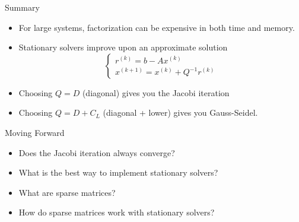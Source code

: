 \documentclass[10pt]{beamer}
\begin{document}



\begin{frame}{Summary}
    \begin{itemize}
    \item For large systems, factorization can be expensive in both time and memory.
        \vfill 
        \item Stationary solvers improve upon an approximate solution 
        $$\begin{cases}
    r^{(k)} = b - Ax^{(k)} \\
    x^{(k+1)} = x^{(k)} + Q^{-1} r^{(k)}
    \end{cases}$$
        \item Choosing $Q=D$ (diagonal) gives you the Jacobi iteration
        \vfill
        \item Choosing $Q=D+C_L$ (diagonal + lower) gives you Gauss-Seidel.
    \end{itemize}
\end{frame}

\begin{frame}{Moving Forward}
    \begin{itemize}
        \item Does the Jacobi iteration always converge?
        \vfill 
        \item What is the best way to implement stationary solvers?
        \vfill 
        \item What are sparse matrices? 
        \vfill 
        \item How do sparse matrices work with stationary solvers?
        \vfill 
    \end{itemize}
\end{frame}
\end{document}
